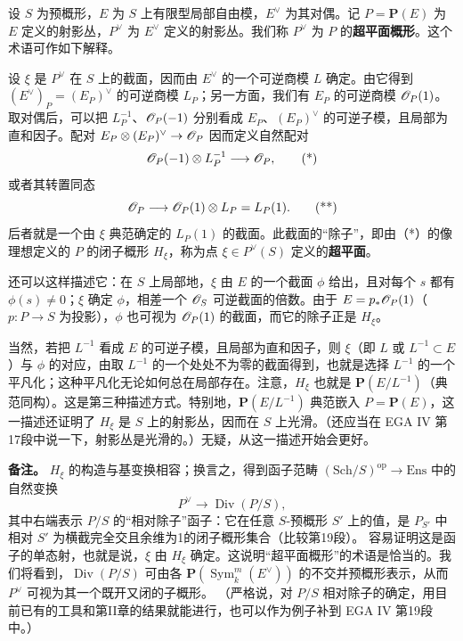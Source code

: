 设 $S$ 为预概形，$E$ 为 $S$ 上有限型局部自由模，$E^\vee$ 为其对偶。记 $P=\mathbf P(E)$ 为 $E$ 定义的射影丛，$P^\vee$ 为 $E^\vee$ 定义的射影丛。我们称 $P^\vee$ 为 $P$ 的\textbf{超平面概形}。这个术语可作如下解释。

设 $\xi$ 是 $P^\vee$ 在 $S$ 上的截面，因而由 $E^\vee$ 的一个可逆商模 $L$ 确定。由它得到 $(E^\vee)_P=(E_P)^\vee$ 的可逆商模 $L_P$；另一方面，我们有 $E_P$ 的可逆商模 $\mathscr O_P(1)$。取对偶后，可以把 $L_P^{-1}$、$\mathscr O_P(-1)$ 分别看成 $E_P$、$(E_P)^\vee$ 的可逆子模，且局部为直和因子。配对 $E_P\otimes(E_P)^\vee\to\mathscr O_P$ 因而定义自然配对
\begin{equation}
 \mathscr O_P(-1)\otimes L_P^{-1}\longrightarrow\mathscr O_P,\tag{*}
\end{equation}
或者其转置同态
\begin{equation}
 \mathscr O_P\longrightarrow\mathscr O_P(1)\otimes L_P=L_P(1).\tag{**}
\end{equation}
后者就是一个由 $\xi$ 典范确定的 $L_P(1)$ 的截面。此截面的“除子”，即由（*）的像理想定义的 $P$ 的闭子概形 $H_\xi$，称为点 $\xi\in P^\vee(S)$ 定义的\textbf{超平面}。

还可以这样描述它：在 $S$ 上局部地，$\xi$ 由 $E$ 的一个截面 $\phi$ 给出，且对每个 $s$ 都有 $\phi(s)\ne0$；$\xi$ 确定 $\phi$，相差一个 $\mathscr O_S$ 可逆截面的倍数。由于 $E=p_*\mathscr O_P(1)$（$p:P\to S$ 为投影），$\phi$ 也可视为 $\mathscr O_P(1)$ 的截面，而它的除子正是 $H_\xi$。

当然，若把 $L^{-1}$ 看成 $E$ 的可逆子模，且局部为直和因子，则 $\xi$（即 $L$ 或 $L^{-1}\subset E$）与 $\phi$ 的对应，由取 $L^{-1}$ 的一个处处不为零的截面得到，也就是选择 $L^{-1}$ 的一个平凡化；这种平凡化无论如何总在局部存在。注意，$H_\xi$ 也就是 $\mathbf P(E/L^{-1})$（典范同构）。这是第三种描述方式。特别地，$\mathbf P(E/L^{-1})$ 典范嵌入 $P=\mathbf P(E)$，这一描述还证明了 $H_\xi$ 是 $S$ 上的射影丛，因而在 $S$ 上光滑。（还应当在 EGA IV 第17段中说一下，射影丛是光滑的。）无疑，从这一描述开始会更好。

\noindent\textbf{备注。}
$H_\xi$ 的构造与基变换相容；换言之，得到函子范畴 $(\mathrm{Sch}/S)^{\mathrm{op}}\to\mathrm{Ens}$ 中的自然变换
\[
 P^\vee\longrightarrow\operatorname{Div}(P/S),
\]
其中右端表示 $P/S$ 的“相对除子”函子：它在任意 $S$-预概形 $S'$ 上的值，是 $P_{S'}$ 中相对 $S'$ 为横截完全交且余维为1的闭子概形集合（比较第19段）。
容易证明这是函子的单态射，也就是说，$\xi$ 由 $H_\xi$ 确定。这说明“超平面概形”的术语是恰当的。我们将看到，$\operatorname{Div}(P/S)$ 可由各 $\mathbf P(\operatorname{Sym}^m_k(E^\vee))$ 的不交并预概形表示，从而 $P^\vee$ 可视为其一个既开又闭的子概形。
（严格说，对 $P/S$ 相对除子的确定，用目前已有的工具和第II章的结果就能进行，也可以作为例子补到 EGA IV 第19段中。）

